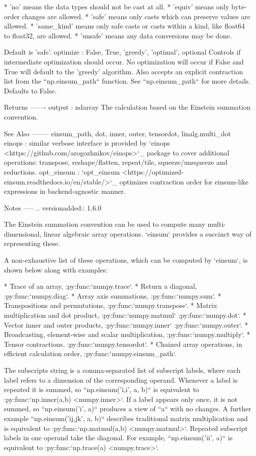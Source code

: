 \begin{DoxyVerb}
      * 'no' means the data types should not be cast at all.
      * 'equiv' means only byte-order changes are allowed.
      * 'safe' means only casts which can preserve values are allowed.
      * 'same_kind' means only safe casts or casts within a kind,
        like float64 to float32, are allowed.
      * 'unsafe' means any data conversions may be done.

    Default is 'safe'.
optimize : {False, True, 'greedy', 'optimal'}, optional
    Controls if intermediate optimization should occur. No optimization
    will occur if False and True will default to the 'greedy' algorithm.
    Also accepts an explicit contraction list from the ``np.einsum_path``
    function. See ``np.einsum_path`` for more details. Defaults to False.

Returns
-------
output : ndarray
    The calculation based on the Einstein summation convention.

See Also
--------
einsum_path, dot, inner, outer, tensordot, linalg.multi_dot
einops :
    similar verbose interface is provided by
    `einops <https://github.com/arogozhnikov/einops>`_ package to cover
    additional operations: transpose, reshape/flatten, repeat/tile,
    squeeze/unsqueeze and reductions.
opt_einsum :
    `opt_einsum <https://optimized-einsum.readthedocs.io/en/stable/>`_
    optimizes contraction order for einsum-like expressions
    in backend-agnostic manner.

Notes
-----
.. versionadded:: 1.6.0

The Einstein summation convention can be used to compute
many multi-dimensional, linear algebraic array operations. `einsum`
provides a succinct way of representing these.

A non-exhaustive list of these operations,
which can be computed by `einsum`, is shown below along with examples:

* Trace of an array, :py:func:`numpy.trace`.
* Return a diagonal, :py:func:`numpy.diag`.
* Array axis summations, :py:func:`numpy.sum`.
* Transpositions and permutations, :py:func:`numpy.transpose`.
* Matrix multiplication and dot product, :py:func:`numpy.matmul` :py:func:`numpy.dot`.
* Vector inner and outer products, :py:func:`numpy.inner` :py:func:`numpy.outer`.
* Broadcasting, element-wise and scalar multiplication, :py:func:`numpy.multiply`.
* Tensor contractions, :py:func:`numpy.tensordot`.
* Chained array operations, in efficient calculation order, :py:func:`numpy.einsum_path`.

The subscripts string is a comma-separated list of subscript labels,
where each label refers to a dimension of the corresponding operand.
Whenever a label is repeated it is summed, so ``np.einsum('i,i', a, b)``
is equivalent to :py:func:`np.inner(a,b) <numpy.inner>`. If a label
appears only once, it is not summed, so ``np.einsum('i', a)`` produces a
view of ``a`` with no changes. A further example ``np.einsum('ij,jk', a, b)``
describes traditional matrix multiplication and is equivalent to
:py:func:`np.matmul(a,b) <numpy.matmul>`. Repeated subscript labels in one
operand take the diagonal. For example, ``np.einsum('ii', a)`` is equivalent
to :py:func:`np.trace(a) <numpy.trace>`.


\end{DoxyVerb}
